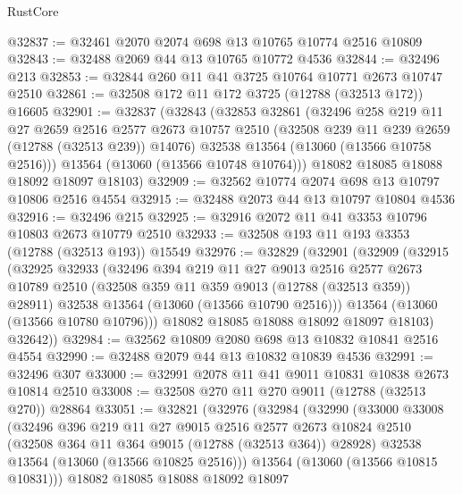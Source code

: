 \begin{lexlean}{RustCore}
\begin{coremodule}
@32837 := @32461 @2070 @2074 @698 @13 @10765 @10774 @2516 @10809
@32843 := @32488 @2069 @44 @13 @10765 @10772 @4536
@32844 := @32496 @213
@32853 := @32844 @260 @11 @41 @3725 @10764 @10771 @2673 @10747 @2510
@32861 := @32508 @172 @11 @172 @3725 (@12788 (@32513 @172)) @16605
@32901 := @32837
    (@32843
      (@32853
        @32861
        (@32496
          @258
          @219
          @11
          @27
          @2659
          @2516
          @2577
          @2673
          @10757
          @2510
          (@32508 @239 @11 @239 @2659 (@12788 (@32513 @239)) @14076)
          @32538
          @13564
          (@13060 (@13566 @10758 @2516)))
        @13564
        (@13060 (@13566 @10748 @10764)))
      @18082
      @18085
      @18088
      @18092
      @18097
      @18103)
@32909 := @32562 @10774 @2074 @698 @13 @10797 @10806 @2516 @4554
@32915 := @32488 @2073 @44 @13 @10797 @10804 @4536
@32916 := @32496 @215
@32925 := @32916 @2072 @11 @41 @3353 @10796 @10803 @2673 @10779 @2510
@32933 := @32508 @193 @11 @193 @3353 (@12788 (@32513 @193)) @15549
@32976 := @32829
    (@32901
      (@32909
        (@32915
          (@32925
            @32933
            (@32496
              @394
              @219
              @11
              @27
              @9013
              @2516
              @2577
              @2673
              @10789
              @2510
              (@32508 @359 @11 @359 @9013 (@12788 (@32513 @359)) @28911)
              @32538
              @13564
              (@13060 (@13566 @10790 @2516)))
            @13564
            (@13060 (@13566 @10780 @10796)))
          @18082
          @18085
          @18088
          @18092
          @18097
          @18103)
        @32642))
@32984 := @32562 @10809 @2080 @698 @13 @10832 @10841 @2516 @4554
@32990 := @32488 @2079 @44 @13 @10832 @10839 @4536
@32991 := @32496 @307
@33000 := @32991 @2078 @11 @41 @9011 @10831 @10838 @2673 @10814 @2510
@33008 := @32508 @270 @11 @270 @9011 (@12788 (@32513 @270)) @28864
@33051 := @32821
    (@32976
      (@32984
        (@32990
          (@33000
            @33008
            (@32496
              @396
              @219
              @11
              @27
              @9015
              @2516
              @2577
              @2673
              @10824
              @2510
              (@32508 @364 @11 @364 @9015 (@12788 (@32513 @364)) @28928)
              @32538
              @13564
              (@13060 (@13566 @10825 @2516)))
            @13564
            (@13060 (@13566 @10815 @10831)))
          @18082
          @18085
          @18088
          @18092
          @18097

\end{coremodule}
\end{lexlean}
